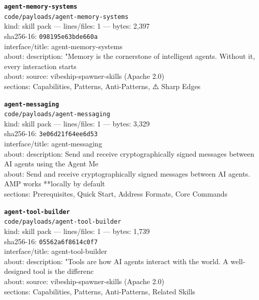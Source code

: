 \noindent\textbf{\texttt{agent-memory-systems}}\\
\texttt{code/payloads/agent-memory-systems}\\
kind: skill pack --- lines/files: 1 --- bytes: 2,397\\
sha256-16: \texttt{098195e63bde660a}\\
interface/title: agent-memory-systems\\
about: description: "Memory is the cornerstone of intelligent agents. Without it, every interaction starts \\
about: source: vibeship-spawner-skills (Apache 2.0)\\
sections: Capabilities, Patterns, Anti-Patterns, ⚠️ Sharp Edges\\
\vspace*{6.0pt}
\clearpage

\noindent\textbf{\texttt{agent-messaging}}\\
\texttt{code/payloads/agent-messaging}\\
kind: skill pack --- lines/files: 1 --- bytes: 3,329\\
sha256-16: \texttt{3e06d21f64ee6d53}\\
interface/title: agent-messaging\\
about: description: Send and receive cryptographically signed messages between AI agents using the Agent Me\\
about: Send and receive cryptographically signed messages between AI agents. AMP works **locally by default\\
sections: Prerequisites, Quick Start, Address Formats, Core Commands\\
\vspace*{6.0pt}

\noindent\textbf{\texttt{agent-tool-builder}}\\
\texttt{code/payloads/agent-tool-builder}\\
kind: skill pack --- lines/files: 1 --- bytes: 1,739\\
sha256-16: \texttt{05562a6f8614c0f7}\\
interface/title: agent-tool-builder\\
about: description: "Tools are how AI agents interact with the world. A well-designed tool is the differenc\\
about: source: vibeship-spawner-skills (Apache 2.0)\\
sections: Capabilities, Patterns, Anti-Patterns, Related Skills\\
\vspace*{6.0pt}
\newpage

